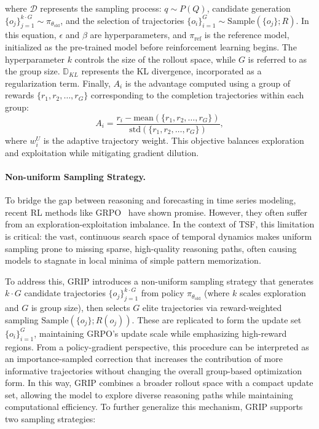 where $\mathcal{D}$ represents the sampling process: $q \sim P(Q)$, candidate generation $\{o_j\}_{j=1}^{k \cdot G} \sim \pi_{\theta_{\text{old}}}$, and the selection of trajectories $\{o_i\}_{i=1}^G \sim \text{Sample}(\{o_j\}; R)$. 
In this equation, $\epsilon$ and $\beta$ are hyperparameters, and $\pi_{\text{ref}}$ is the reference model, initialized as the pre-trained model before reinforcement learning begins. The hyperparameter $k$ controls the size of the rollout space, while $G$ is referred to as the group size. $\mathbb{D}_{KL}$ represents the KL divergence, incorporated as a regularization term. Finally, $A_i$ is the advantage computed using a group of rewards $\{r_1, r_2, \dots, r_G\}$ corresponding to the completion trajectories within each group:
\begin{equation}
    A_i = \frac{r_i - \text{mean}(\{r_1, r_2, \dots, r_G\})}{\text{std}(\{r_1, r_2, \dots, r_G\})},
\end{equation}
where $w_i^U$ is the adaptive trajectory weight. This objective balances exploration and exploitation while mitigating gradient dilution.





\paragraph{Non-uniform Sampling Strategy.}
\label{sec:sampling}

To bridge the gap between reasoning and forecasting in time series modeling, recent RL methods like GRPO~\cite{shao2024deepseekmath} have shown promise. However, they often suffer from an exploration-exploitation imbalance. 
In the context of TSF, this limitation is critical: the vast, continuous search space of temporal dynamics makes uniform sampling prone to missing sparse, high-quality reasoning paths, often causing models to stagnate in local minima of simple pattern memorization.

To address this, GRIP introduces a non-uniform sampling strategy that generates $k \cdot G$ candidate trajectories $\{o_j\}_{j=1}^{k \cdot G}$ from policy $\pi_{\theta_{\text{old}}}$ (where $k$ scales exploration and $G$ is group size), then selects $G$ elite trajectories via reward-weighted sampling $\text{Sample}(\{o_j\}; R(o_j))$. These are replicated to form the update set $\{o_i\}_{i=1}^G$, maintaining GRPO's update scale while emphasizing high-reward regions. 
From a policy-gradient perspective, this procedure can be interpreted as an importance-sampled correction that increases the contribution of more informative trajectories without changing the overall group-based optimization form. In this way, GRIP combines a broader rollout space with a compact update set, allowing the model to explore diverse reasoning paths while maintaining computational efficiency. To further generalize this mechanism, GRIP supports two sampling strategies:

